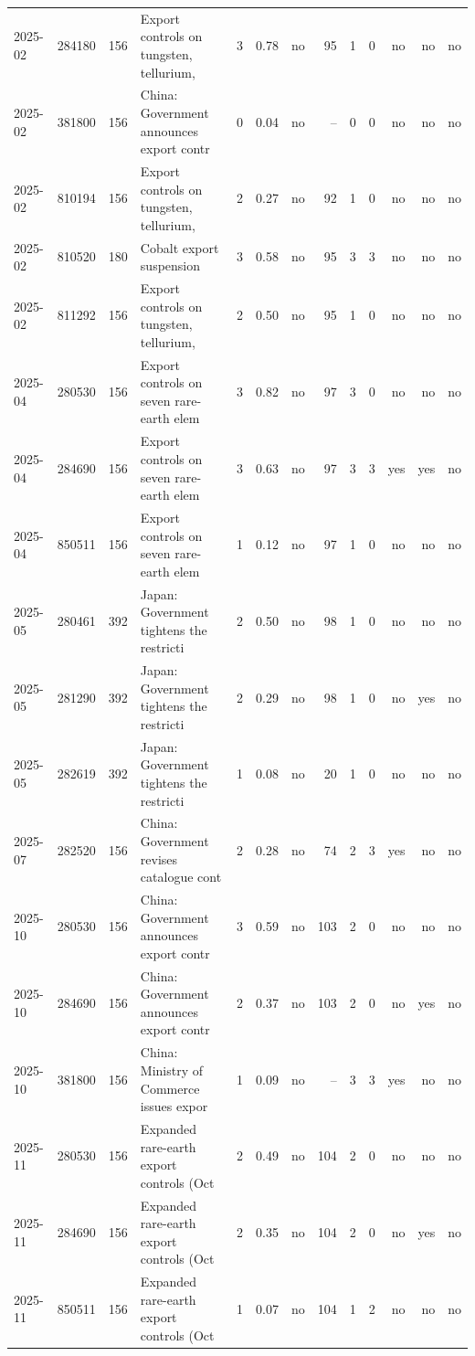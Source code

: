 \begin{minipage}{\linewidth}
\begin{tabular}{lllp{4.2cm}rrrrrrrrr}
2025-02 & 284180 & 156 & Export controls on tungsten, tellurium,  & 3 & 0.78 & no & 95 & 1 & 0 & no & no & no \\
2025-02 & 381800 & 156 & China: Government announces export contr & 0 & 0.04 & no & -- & 0 & 0 & no & no & no \\
2025-02 & 810194 & 156 & Export controls on tungsten, tellurium,  & 2 & 0.27 & no & 92 & 1 & 0 & no & no & no \\
2025-02 & 810520 & 180 & Cobalt export suspension & 3 & 0.58 & no & 95 & 3 & 3 & no & no & no \\
2025-02 & 811292 & 156 & Export controls on tungsten, tellurium,  & 2 & 0.50 & no & 95 & 1 & 0 & no & no & no \\
2025-04 & 280530 & 156 & Export controls on seven rare-earth elem & 3 & 0.82 & no & 97 & 3 & 0 & no & no & no \\
2025-04 & 284690 & 156 & Export controls on seven rare-earth elem & 3 & 0.63 & no & 97 & 3 & 3 & yes & yes & no \\
2025-04 & 850511 & 156 & Export controls on seven rare-earth elem & 1 & 0.12 & no & 97 & 1 & 0 & no & no & no \\
2025-05 & 280461 & 392 & Japan: Government tightens the restricti & 2 & 0.50 & no & 98 & 1 & 0 & no & no & no \\
2025-05 & 281290 & 392 & Japan: Government tightens the restricti & 2 & 0.29 & no & 98 & 1 & 0 & no & yes & no \\
2025-05 & 282619 & 392 & Japan: Government tightens the restricti & 1 & 0.08 & no & 20 & 1 & 0 & no & no & no \\
2025-07 & 282520 & 156 & China: Government revises catalogue cont & 2 & 0.28 & no & 74 & 2 & 3 & yes & no & no \\
2025-10 & 280530 & 156 & China: Government announces export contr & 3 & 0.59 & no & 103 & 2 & 0 & no & no & no \\
2025-10 & 284690 & 156 & China: Government announces export contr & 2 & 0.37 & no & 103 & 2 & 0 & no & yes & no \\
2025-10 & 381800 & 156 & China: Ministry of Commerce issues expor & 1 & 0.09 & no & -- & 3 & 3 & yes & no & no \\
2025-11 & 280530 & 156 & Expanded rare-earth export controls (Oct & 2 & 0.49 & no & 104 & 2 & 0 & no & no & no \\
2025-11 & 284690 & 156 & Expanded rare-earth export controls (Oct & 2 & 0.35 & no & 104 & 2 & 0 & no & yes & no \\
2025-11 & 850511 & 156 & Expanded rare-earth export controls (Oct & 1 & 0.07 & no & 104 & 1 & 2 & no & no & no \\
\bottomrule
\end{tabular}
\end{minipage}
\vspace{14pt}

